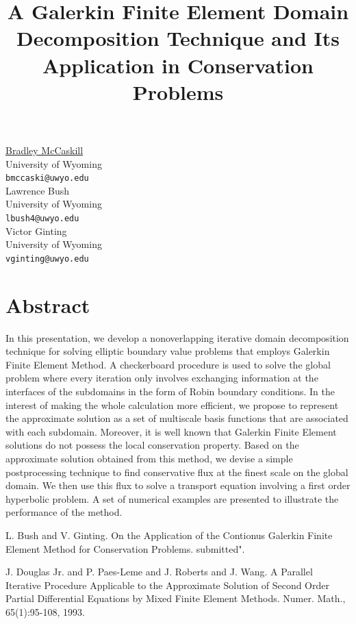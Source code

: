 \documentclass[article,A4,11pt]{llncs}%
\begin{document}
\title{A Galerkin Finite Element Domain Decomposition Technique and Its Application in Conservation Problems}
 \author{} \institute{}
\maketitle
\begin{center}
{\large \underline{Bradley McCaskill}}\\
University of Wyoming\\
{\tt bmccaski@uwyo.edu}
\\ \vspace{4mm}
{\large Lawrence Bush}\\
University of Wyoming\\
{\tt lbush4@uwyo.edu}
\\ \vspace{4mm}
{\large Victor Ginting}\\
University of Wyoming\\
{\tt vginting@uwyo.edu}
\end{center}

\section*{Abstract}
In this presentation, we develop a nonoverlapping iterative domain decomposition technique for solving elliptic boundary value problems that employs Galerkin Finite Element Method. A checkerboard procedure is used to solve the global problem where every iteration only involves exchanging information at the interfaces of the subdomains in the form of Robin boundary conditions. In the interest of making the whole calculation more efficient, we propose to represent the approximate solution as a set of multiscale basis functions that are associated with each subdomain. Moreover, it is well known that Galerkin Finite Element solutions do not possess the local conservation property. Based on the approximate solution obtained from this method, we devise a simple postprocessing technique to find conservative flux at the finest scale on the global domain. We then use this flux to solve a transport equation involving a first order hyperbolic problem. A set of numerical examples are presented to illustrate the performance of the method.


\begin{thebibliography}{10}
{\sc L. Bush and V. Ginting}. {On the Application of the Contionus Galerkin Finite Element Method for Conservation Problems}. submitted".

{\sc J. Douglas Jr. and P. Paes-Leme and J. Roberts and J. Wang}. {A Parallel Iterative Procedure Applicable to the Approximate Solution of Second Order Partial Differential Equations by Mixed Finite Element Methods}. Numer. Math., 65(1):95-108, 1993.
\end{thebibliography}
\end{document}

